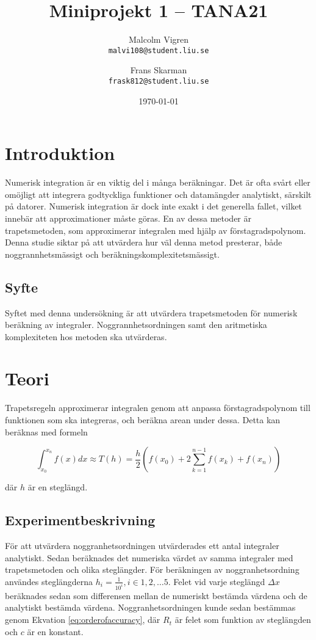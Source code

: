 \documentclass[a4paper,titlepage]{article}
\title{
    \textbf{Miniprojekt 1 -- TANA21}}
\date{\today}
\author{%
    Malcolm Vigren \\
    \texttt{malvi108@student.liu.se}
    \and
    Frans Skarman\\
    \texttt{frask812@student.liu.se}
    }
\begin{document}
\maketitle
\newpage
\tableofcontents
\newpage

\section{Introduktion}
Numerisk integration är en viktig del i många beräkningar. Det är ofta svårt
eller omöjligt att integrera godtyckliga funktioner och datamängder analytiskt,
särskilt på datorer. Numerisk integration är dock inte exakt i det generella
fallet, vilket innebär att approximationer måste göras. En av dessa metoder
är trapetsmetoden, som approximerar integralen med hjälp av förstagradspolynom.
Denna studie siktar på att utvärdera hur väl denna metod presterar,
både noggrannhetsmässigt och beräkningskomplexitetsmässigt.

\subsection{Syfte}
Syftet med denna undersökning är att utvärdera trapetsmetoden för numerisk
beräkning av integraler. Noggrannhetsordningen samt den aritmetiska
komplexiteten hos metoden ska utvärderas.

\section{Teori}
Trapetsregeln approximerar integralen genom att anpassa förstagradspolynom till
funktionen som ska integreras, och beräkna arean under dessa. Detta kan
beräknas med formeln

\begin{equation}
    \int_{x_0}^{x_n}f(x)dx \approx T(h) = \frac{h}{2}(f(x_0) +
    2\sum_{k=1}^{n-1}f(x_k) + f(x_n))
\end{equation}

där $h$ är en steglängd.

\subsection{Experimentbeskrivning}

För att utvärdera noggranhetsordningen utvärderades ett antal integraler
analytiskt. Sedan beräknades det numeriska värdet av samma integraler med
trapetsmetoden och olika steglängder. För beräkningen av noggranhetsordning
användes steglängderna $h_i = \frac{1}{10^i}, i \in {1,2, \dots 5}$.
Felet vid varje steglängd $\Delta x$ beräknades sedan som differensen mellan de numeriskt
bestämda värdena och de analytiskt bestämda värdena.  Noggranhetsordningen
kunde sedan bestämmas genom Ekvation \ref{eq:orderofaccuracy}, där $R_t$
är felet som funktion av steglängden och $c$ är en konstant.
\end{document}
